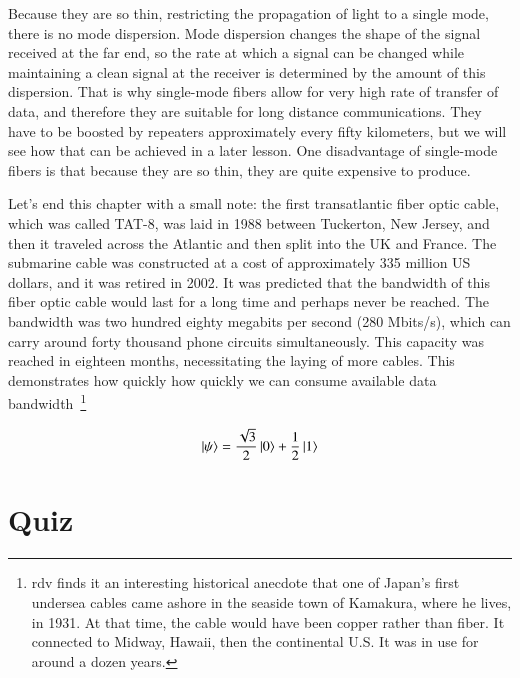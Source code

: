 Because they are so thin, restricting the propagation of light to a single mode, there is no mode dispersion.  Mode dispersion changes the shape of the signal received at the far end, so the rate at which a signal can be changed while maintaining a clean signal at the receiver is determined by the amount of this dispersion. That is why single-mode fibers allow for very high rate of transfer of data, and therefore they are suitable for long distance communications. They have to be boosted by repeaters approximately every fifty kilometers, but we will see how that can be achieved in a later lesson. One disadvantage of single-mode fibers is that because they are so thin, they are quite expensive to produce.

Let's end this chapter with a small note: the first transatlantic fiber optic cable, which was called TAT-8, was laid in 1988 between Tuckerton, New Jersey, and then it traveled across the Atlantic and then split into the UK and France. The submarine cable was constructed at a cost of approximately 335 million US dollars, and it was retired in 2002. It was predicted that the bandwidth of this fiber optic cable would last for a long time and perhaps never be reached. The bandwidth was two hundred eighty megabits per second (280 Mbits/s), which can carry around forty thousand phone circuits simultaneously. This capacity was reached in eighteen months, necessitating the laying of more cables. This demonstrates how quickly how quickly we can consume available data bandwidth~\footnote{rdv finds it an interesting historical anecdote that one of Japan's first undersea cables came ashore in the seaside town of Kamakura, where he lives, in 1931.  At that time, the cable would have been copper rather than fiber.  It connected to Midway, Hawaii, then the continental U.S.  It was in use for around a dozen years.}

\newpage
\begin{exercises}
\begin{equation*}
\left| \psi \right\rangle = \frac{\sqrt{3}}{2}\left| 0 \right\rangle + \frac{1}{2}\left| 1 \right\rangle
\end{equation*}


\end{exercises}

\newpage
\section*{Quiz}

